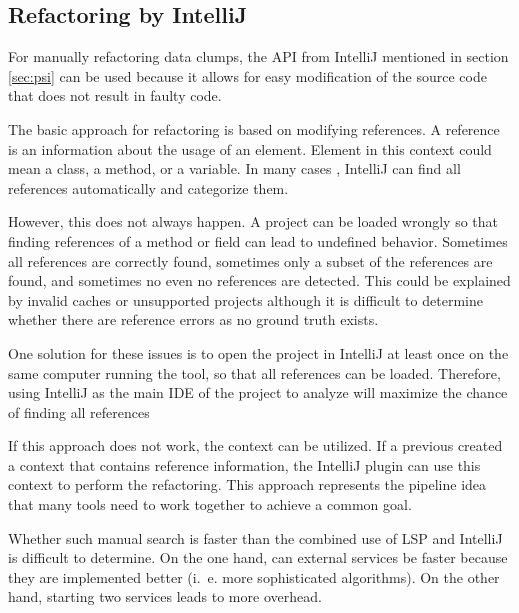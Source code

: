  


\subsection{Refactoring by IntelliJ} \label{sec:intellij_refactoring}

For  manually refactoring data clumps, the  \ac{API} from IntelliJ mentioned in section \ref{sec:psi} can be used because it allows for easy modification of the source code that does not result in faulty code. 


\begin{comment}The reasons for this are difficult to determine and the documentation is scarce, so the the PSI approach seems to be only suitable for projects created via IntelliJ or correctly initialized by IntelliJ with the required meta data. Gradle and maven projects are therefore not suitable for the full refactoring step. 
\end{comment}


The basic approach for refactoring is based on modifying references. A  reference is an information about the usage of an element. Element in this context could mean a class, a method, or a variable.
In many cases , IntelliJ can find all references automatically and categorize them.

However, this does not always happen. A project can be loaded wrongly so that  finding references of a method or field can lead to undefined behavior. Sometimes all references are correctly found, sometimes only a subset of the references are found, and sometimes no even no references are detected. This could be explained by invalid caches or unsupported projects although it is difficult to determine whether there are reference errors as no ground truth exists.

One solution for these issues is to open the project in IntelliJ at least once  on the same computer running the tool, so that all references can be loaded. Therefore, using IntelliJ as the main \ac{IDE} of the project to analyze will maximize the chance of finding all references



If this approach does not work, the context can be utilized. If a previous created a context that contains reference information, the IntelliJ plugin can use this context to perform the refactoring. This approach represents the pipeline idea that many tools need to work together to achieve a common goal.


Whether such manual search is faster than the combined use of \ac{LSP} and IntelliJ is difficult to determine. On the one hand, can external services be faster because they are implemented better (i.~e. more sophisticated algorithms). On the other hand, starting two services leads to more overhead. 



